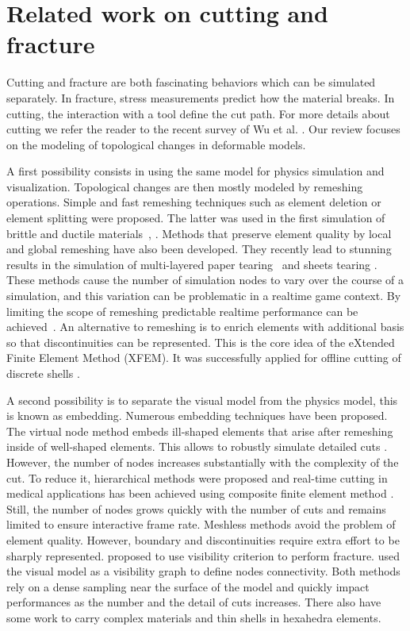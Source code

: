 \section{Related work on cutting and fracture}

Cutting and fracture are both fascinating behaviors which can be simulated separately. In fracture, stress measurements predict how the material breaks. In cutting, the interaction with a tool define the cut path. For more details about cutting we refer the reader to the recent survey of Wu et al. \cite{Wu2015}. Our review focuses on the modeling of topological changes in deformable models.

A first possibility consists in using the same model for physics simulation and visualization. Topological changes are then mostly modeled by remeshing operations. Simple and fast remeshing techniques such as element deletion or element splitting were proposed. The latter was used in the first simulation of brittle and ductile materials~\cite{OBrien1999}, \cite{OBrien2002}. 
 Methods that preserve element quality by local and global remeshing have also been developed. They recently lead to stunning results in the simulation of multi-layered paper tearing~\cite{Busaryev2013} and sheets tearing \cite{Pfaff2014}. 
These methods cause the number of simulation nodes to vary over the course of a simulation, and this variation can be problematic in a realtime game context.  By limiting the
scope of remeshing predictable realtime performance can be achieved~\cite{Parker2009}.
An alternative to remeshing is to enrich elements with additional basis so that discontinuities can be represented. This is the core idea of the eXtended Finite Element Method (XFEM). It was successfully applied for offline cutting of discrete shells \cite{Kaufmann2009}.

A second possibility is to separate the visual model from the physics model, this is known as embedding. Numerous embedding techniques have been proposed. The virtual node method \cite{Molino2004} embeds ill-shaped elements that arise after remeshing inside of well-shaped elements. This allows to robustly simulate detailed cuts \cite{Wang2014}. However, the number of nodes increases substantially with the complexity of the cut. To reduce it, hierarchical methods were proposed and real-time cutting in medical applications has been achieved using composite finite element method \cite{Wu2011}. Still, the number of nodes grows quickly with the number of cuts and remains limited to ensure interactive frame rate. Meshless methods avoid the problem of element quality. However, boundary and discontinuities require extra effort to be sharply represented. \cite{Pauly2005} proposed to use visibility criterion to perform fracture. \cite{Steinemann2009} used the visual model as a visibility graph to define nodes connectivity. Both methods rely on a dense sampling near the surface of the model and quickly impact performances as the number  and the detail of cuts increases. There also have some work to carry complex materials \cite{Nesme2009} and thin shells \cite{Remillard2013} in hexahedra elements.

